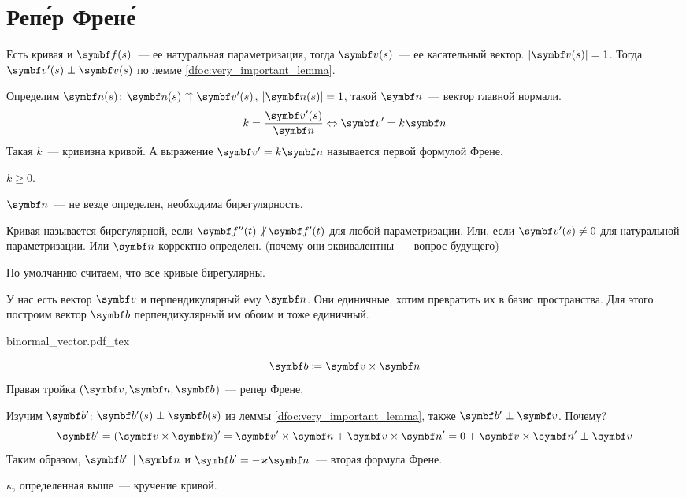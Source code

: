 \documentclass[main]{subfiles}
\begin{document}
\chapter{Реп\'ер Френ\'е}

Есть кривая и $\vf(s)$~--- ее натуральная параметризация, тогда $\vv(s)$~--- ее касательный вектор.
$|\vv(s)| = 1$.
Тогда $\vv'(s) \perp \vv(s)$ по лемме \ref{dfoc:very_important_lemma}.
\begin{definition}
    Определим $\vn(s)$: $\vn(s) \upuparrows \vv'(s)$, $|\vn(s)| = 1$,
    такой $\vn$~--- вектор главной нормали.
    \[k = \frac{\vv ' (s)}{\vn} \Leftrightarrow \vv' = k \vn\]
    Такая $k$~--- кривизна кривой.
    А выражение $\vv' = k \vn$ называется первой формулой Френе.
\end{definition}
\begin{remark}
    $k \ge 0$.
\end{remark}
\begin{remark}
    $\vn$~--- не везде определен, необходима бирегулярность.
\end{remark}

\begin{definition}
    Кривая называется бирегулярной, если $\vf''(t) \not\parallel \vf'(t)$ для любой параметризации.
    Или, если $\vv'(s) \neq 0$ для натуральной параметризации.
    Или $\vn$ корректно определен.
    (почему они эквивалентны~--- вопрос будущего)
\end{definition}

По умолчанию считаем, что все кривые бирегулярны.

У нас есть вектор $\vv$ и перпендикулярный ему $\vn$.
Они единичные, хотим превратить их в базис пространства.
Для этого построим вектор $\vb$ перпендикулярный им обоим и тоже единичный.
\begin{center}
    {binormal_vector.pdf_tex}
\end{center}

\begin{definition}
    \[\vb \coloneqq \vv \times \vn\]
    Правая тройка $(\vv,\vn, \vb$)~--- репер Френе.
\end{definition}

Изучим $\vb'$:
$\vb'(s) \perp \vb(s)$ из леммы \ref{dfoc:very_important_lemma},
также $\vb' \perp \vv$. Почему?
\[\vb' = (\vv \times \vn)' = \vv' \times \vn + \vv\times \vn' = 0 + \vv\times \vn' \perp \vv\]
Таким образом, $\vb' \parallel \vn$ и $\vb' = -\kappa \vn$~--- вторая формула Френе.
\begin{definition}
    $\kappa$, определенная выше~--- кручение кривой.
\end{definition}
\end{document}
